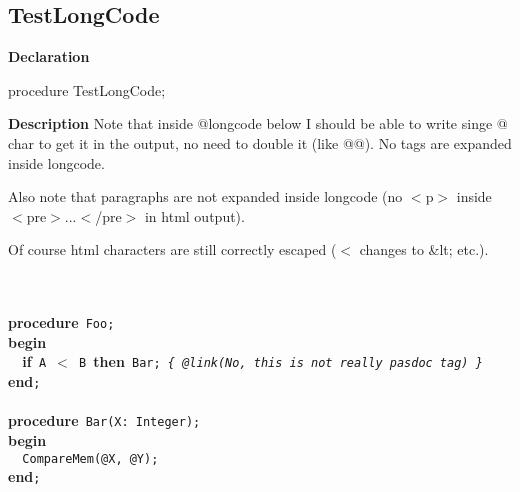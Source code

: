 \documentclass{report}
\newif\ifpdf
\begin{document}
\subsection*{TestLongCode}
\fi
\label{ok_expanding_descriptions-TestLongCode}
\begin{list}{}{
\setlength{\itemindent}{0cm}
\setlength{\listparindent}{0cm}
\setlength{\leftmargin}{\evensidemargin}
\addtolength{\leftmargin}{\tmplength}
\settowidth{\labelsep}{X}
\addtolength{\leftmargin}{\labelsep}
\setlength{\labelwidth}{\tmplength}
}
\item[\textbf{Declaration}\hfill]
\ifpdf
\begin{flushleft}
\fi
\begin{ttfamily}
procedure TestLongCode;\end{ttfamily}

\ifpdf
\end{flushleft}
\fi

\par
\item[\textbf{Description}]
Note that inside @longcode below I should be able to write singe @ char to get it in the output, no need to double it (like @@). No tags are expanded inside longcode.

Also note that paragraphs are not expanded inside longcode (no {$<$}p{$>$} inside {$<$}pre{$>$}...{$<$}/pre{$>$} in html output).

Of course html characters are still correctly escaped ({$<$} changes to {\&}lt; etc.).

\texttt{\\\nopagebreak[3]
\\\nopagebreak[3]
}\textbf{procedure}\texttt{~Foo;\\\nopagebreak[3]
}\textbf{begin}\texttt{\\\nopagebreak[3]
~~}\textbf{if}\texttt{~A~{$<$}~B~}\textbf{then}\texttt{~Bar;~\textit{{\{}~@link(No,~this~is~not~really~pasdoc~tag)~{\}}}\\\nopagebreak[3]
}\textbf{end}\texttt{;\\\nopagebreak[3]
\\\nopagebreak[3]
}\textbf{procedure}\texttt{~Bar(X:~Integer);\\\nopagebreak[3]
}\textbf{begin}\texttt{\\\nopagebreak[3]
~~CompareMem(@X,~@Y);\\\nopagebreak[3]
}\textbf{end}\texttt{;\\
}

\end{list}
\ifpdf
\end{document}
